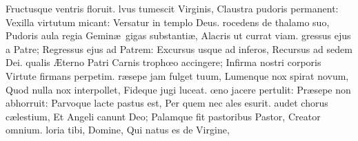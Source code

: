 \documentclass[letter,11pt]{book}
\begin{document}
\begin{multicols*}{2}
\newline \indent Fructusque ventris floruit.
lvus tumescit Virginis,
\newline \indent Claustra pudoris permanent:
\newline \indent Vexilla virtutum micant:
\newline \indent Versatur in templo Deus.
rocedens de thalamo suo,
\newline \indent Pudoris aula regia
\newline \indent Gemin\ae \ gigas substanti\ae ,
\newline \indent Alacris ut currat viam.
gressus ejus a Patre;
\newline \indent Regressus ejus ad Patrem:
\newline \indent Excursus usque ad inferos,
\newline \indent Recursus ad sedem Dei.
\newline {\color{Red} \AE }qualis \AE terno Patri
\newline \indent Carnis troph\oe o accingere;
\newline \indent Infirma nostri corporis
\newline \indent Virtute firmans perpetim.
r\ae sepe jam fulget tuum,
\newline \indent Lumenque nox spirat novum,
\newline \indent Quod nulla nox interpollet,
\newline \indent Fideque jugi luceat.
\oe no jacere pertulit:
\newline \indent Pr\ae sepe non abhorruit:
\newline \indent Parvoque lacte pastus est,
\newline \indent Per quem nec ales esurit.
audet chorus c\ae lestium,
\newline \indent Et Angeli canunt Deo;
\newline \indent Palamque fit pastoribus
\newline \indent Pastor, Creator omnium.
loria tibi, Domine,
\newline \indent Qui natus es de Virgine,

\end{multicols*}
\end{document}
